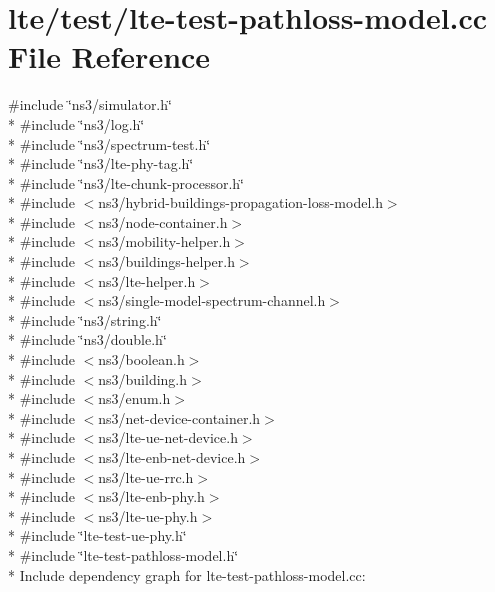 \hypertarget{lte-test-pathloss-model_8cc}{}\section{lte/test/lte-\/test-\/pathloss-\/model.cc File Reference}
\label{lte-test-pathloss-model_8cc}
{\ttfamily \#include \char`\"{}ns3/simulator.\+h\char`\"{}}\\*
{\ttfamily \#include \char`\"{}ns3/log.\+h\char`\"{}}\\*
{\ttfamily \#include \char`\"{}ns3/spectrum-\/test.\+h\char`\"{}}\\*
{\ttfamily \#include \char`\"{}ns3/lte-\/phy-\/tag.\+h\char`\"{}}\\*
{\ttfamily \#include \char`\"{}ns3/lte-\/chunk-\/processor.\+h\char`\"{}}\\*
{\ttfamily \#include $<$ns3/hybrid-\/buildings-\/propagation-\/loss-\/model.\+h$>$}\\*
{\ttfamily \#include $<$ns3/node-\/container.\+h$>$}\\*
{\ttfamily \#include $<$ns3/mobility-\/helper.\+h$>$}\\*
{\ttfamily \#include $<$ns3/buildings-\/helper.\+h$>$}\\*
{\ttfamily \#include $<$ns3/lte-\/helper.\+h$>$}\\*
{\ttfamily \#include $<$ns3/single-\/model-\/spectrum-\/channel.\+h$>$}\\*
{\ttfamily \#include \char`\"{}ns3/string.\+h\char`\"{}}\\*
{\ttfamily \#include \char`\"{}ns3/double.\+h\char`\"{}}\\*
{\ttfamily \#include $<$ns3/boolean.\+h$>$}\\*
{\ttfamily \#include $<$ns3/building.\+h$>$}\\*
{\ttfamily \#include $<$ns3/enum.\+h$>$}\\*
{\ttfamily \#include $<$ns3/net-\/device-\/container.\+h$>$}\\*
{\ttfamily \#include $<$ns3/lte-\/ue-\/net-\/device.\+h$>$}\\*
{\ttfamily \#include $<$ns3/lte-\/enb-\/net-\/device.\+h$>$}\\*
{\ttfamily \#include $<$ns3/lte-\/ue-\/rrc.\+h$>$}\\*
{\ttfamily \#include $<$ns3/lte-\/enb-\/phy.\+h$>$}\\*
{\ttfamily \#include $<$ns3/lte-\/ue-\/phy.\+h$>$}\\*
{\ttfamily \#include \char`\"{}lte-\/test-\/ue-\/phy.\+h\char`\"{}}\\*
{\ttfamily \#include \char`\"{}lte-\/test-\/pathloss-\/model.\+h\char`\"{}}\\*
Include dependency graph for lte-\/test-\/pathloss-\/model.cc\+:
